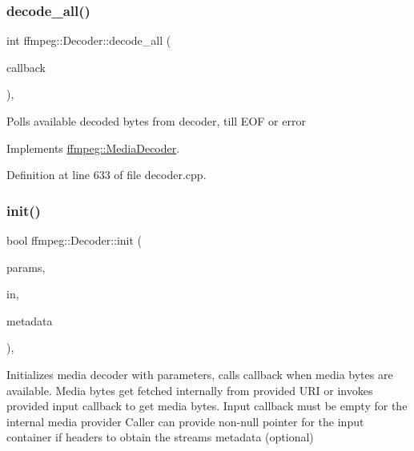 \subsubsection{\texorpdfstring{decode\+\_\+all()}{decode\_all()}}
{\footnotesize\ttfamily int ffmpeg\+::\+Decoder\+::decode\+\_\+all (\begin{DoxyParamCaption}\item[{const Decoder\+Out\+Callback \&}]{callback }\end{DoxyParamCaption})\hspace{0.3cm}{\ttfamily [override]}, {\ttfamily [virtual]}}

Polls available decoded bytes from decoder, till E\+OF or error 

Implements \hyperlink{classffmpeg_1_1MediaDecoder_acaf4668d2c876ede90eaa3a012b7146d}{ffmpeg\+::\+Media\+Decoder}.



Definition at line 633 of file decoder.\+cpp.

\mbox{\label{classffmpeg_1_1Decoder_a05d8eb1d33e6a1e19fe92da06fc7792e}} 
\subsubsection{\texorpdfstring{init()}{init()}}
{\footnotesize\ttfamily bool ffmpeg\+::\+Decoder\+::init (\begin{DoxyParamCaption}\item[{const \hyperlink{structffmpeg_1_1DecoderParameters}{Decoder\+Parameters} \&}]{params,  }\item[{Decoder\+In\+Callback \&\&}]{in,  }\item[{std\+::vector$<$ \hyperlink{structffmpeg_1_1DecoderMetadata}{Decoder\+Metadata} $>$ $\ast$}]{metadata }\end{DoxyParamCaption})\hspace{0.3cm}{\ttfamily [override]}, {\ttfamily [virtual]}}

Initializes media decoder with parameters, calls callback when media bytes are available. Media bytes get fetched internally from provided U\+RI or invokes provided input callback to get media bytes. Input callback must be empty for the internal media provider Caller can provide non-\/null pointer for the input container if headers to obtain the streams metadata (optional) 


